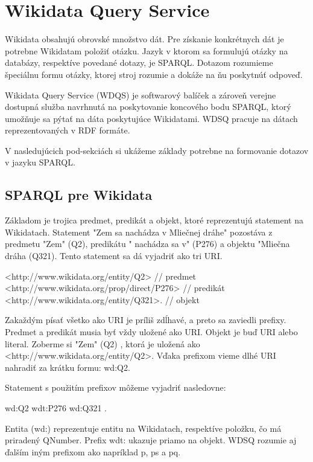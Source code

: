 \section{Wikidata Query Service }
Wikidata obsahujú obrovské množstvo dát. Pre získanie konkrétnych dát je potrebne Wikidatam položiť otázku.
Jazyk v ktorom sa formulujú otázky na databázy, respektíve povedané dotazy,  je SPARQL.
Dotazom rozumieme špeciálnu formu otázky, ktorej
stroj rozumie a dokáže na ňu poskytnúť odpoveď.

Wikidata Query Service (WDQS) je softwarový balíček a zároveň verejne dostupná služba navrhnutá
na poskytovanie koncového bodu SPARQL, ktorý umožňuje sa pýtať na dáta poskytujúce Wikidatami.
WDSQ pracuje na dátach reprezentovaných v RDF formáte.

V nasledujúcich pod-sekciách si ukážeme základy potrebne na formovanie dotazov  v jazyku SPARQL.

\subsection{SPARQL pre Wikidata}
Základom je trojica predmet, predikát a objekt, ktoré reprezentujú statement na Wikidatach.
Statement "Zem sa nachádza v Mliečnej dráhe" pozostáva z predmetu "Zem" (Q2), predikátu "
nachádza sa v" (P276) a objektu "Mliečna dráha (Q321). Tento statement sa dá vyjadriť ako tri URI.

\begin{code}
    <http://www.wikidata.org/entity/Q2> // predmet
    <http://www.wikidata.org/prop/direct/P276> // predikát
    <http://www.wikidata.org/entity/Q321>. // objekt
\end{code}

Zakaždým písať všetko ako URI je príliš zdĺhavé,
a preto sa zaviedli prefixy.
Predmet a predikát musia byť vždy uložené ako URI. Objekt je buď URI alebo literal. Zoberme si "Zem" (Q2) , ktorá je uložená ako
<http://www.wikidata.org/entity/Q2>. Vďaka prefixom vieme dlhé URI nahradiť za krátku formu: wd:Q2.

Statement s použitím prefixov môžeme vyjadriť nasledovne:

\begin{code}
    wd:Q2  wdt:P276  wd:Q321 .
\end{code}

Entita (wd:) reprezentuje entitu na Wikidatach, respektíve položku, čo má priradený QNumber.
Prefix wdt: ukazuje priamo na objekt. WDSQ rozumie aj ďalším iným prefixom ako napríklad p, ps a pq.

